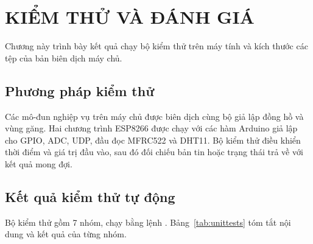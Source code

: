 \chapter{KIỂM THỬ VÀ ĐÁNH GIÁ}\label{chap:kiemthu}

Chương này trình bày kết quả chạy bộ kiểm thử trên máy tính và kích thước các tệp của bản biên dịch máy chủ.

\section{Phương pháp kiểm thử}
Các mô-đun nghiệp vụ trên máy chủ được biên dịch cùng bộ giả lập đồng hồ và vùng găng. Hai chương trình ESP8266 được chạy với các hàm Arduino giả lập cho GPIO, ADC, UDP, đầu đọc MFRC522 và DHT11. Bộ kiểm thử điều khiển thời điểm và giá trị đầu vào, sau đó đối chiếu bản tin hoặc trạng thái trả về với kết quả mong đợi.

\section{Kết quả kiểm thử tự động}
Bộ kiểm thử gồm 7 nhóm, chạy bằng lệnh . Bảng~\ref{tab:unittests}
tóm tắt nội dung và kết quả của từng nhóm.

